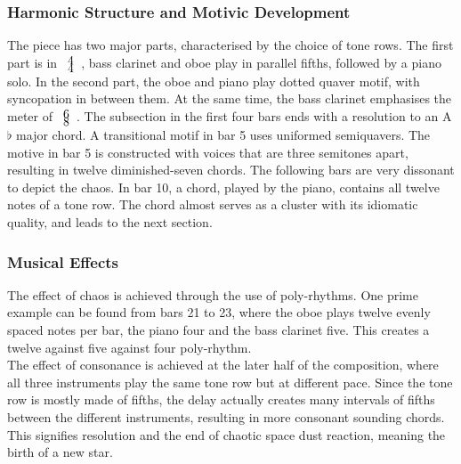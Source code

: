 \documentclass{article}
\begin{document}
\subsubsection{Harmonic Structure and Motivic Development}

The piece has two major parts, characterised by the choice of tone rows.  The
first part is in \(\def\arraystretch{0.0}\begin{array}{c}4\\4\end{array}\),
    bass clarinet and oboe play in parallel fifths, followed by a piano solo.
In the second part, the oboe and piano play dotted quaver motif, with
syncopation in between them.  At the same time, the bass clarinet emphasises
the meter of \(\def\arraystretch{0}\begin{array}{c}6\\8\end{array}\).  The
    subsection in the first four bars ends with a resolution to an A\(\flat\)
major chord. A transitional motif in bar 5 uses uniformed semiquavers. The
motive in bar 5 is constructed with voices that are three semitones apart,
resulting in twelve diminished-seven chords.  The following bars are very
dissonant to depict the chaos. In bar 10, a chord, played by the piano,
contains all twelve notes of a tone row. The chord almost serves as a cluster
with its idiomatic quality, and leads to the next section.\\

\subsubsection{Musical Effects}

The effect of chaos is achieved through the use of poly-rhythms. One prime
example can be found from bars 21 to 23, where the oboe plays twelve evenly
spaced notes per bar, the piano four and the bass clarinet five. This creates a
twelve against five against four poly-rhythm.\\

The effect of consonance is achieved at the later half of the composition,
where all three instruments play the same tone row but at different pace.
Since the tone row is mostly made of fifths, the delay actually creates many
intervals of fifths between the different instruments, resulting in more
consonant sounding chords. This signifies resolution and the end of chaotic
space dust reaction, meaning the birth of a new star.\\
\end{document}
